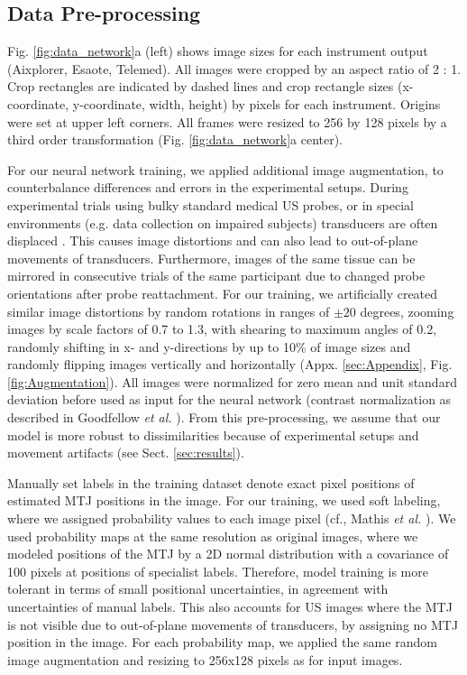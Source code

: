 \documentclass[journal,twoside,web]{ieeecolor}
\begin{document}
\subsection*{Data Pre-processing}
\label{sec:methods.model.datapre}
Fig. \ref{fig:data_network}a (left) shows image sizes for each instrument output (Aixplorer, Esaote, Telemed). All images were cropped by an aspect ratio of 2 : 1. Crop rectangles are indicated by dashed lines and crop rectangle sizes (x-coordinate, y-coordinate, width, height) by pixels for each instrument. Origins were set at upper left corners. All frames were resized to 256 by 128 pixels by a third order transformation (Fig. \ref{fig:data_network}a center). 

For our neural network training, we applied additional image augmentation, to counterbalance differences and errors in the experimental setups. During experimental trials using bulky standard medical US probes, or in special environments (e.g. data collection on impaired subjects) transducers are often displaced \cite{j:Leitner2019}. This causes image distortions and can also lead to out-of-plane movements of transducers. Furthermore, images of the same tissue can be mirrored in consecutive trials of the same participant due to changed probe orientations after probe reattachment. For our training, we artificially created similar image distortions by random rotations in ranges of $\pm 20$ degrees, zooming images by scale factors of 0.7 to 1.3, with shearing to maximum angles of 0.2, randomly shifting in x- and y-directions by up to 10\% of image sizes and randomly flipping images vertically and horizontally (Appx. \ref{sec:Appendix}, Fig.\ref{fig:Augmentation}). All images were normalized for zero mean and unit standard deviation before used as input for the neural network (contrast normalization as described in Goodfellow \textit{et al.} \cite{Goodfellow-et-al-2016}). From this pre-processing, we assume that our model is more robust to dissimilarities because of experimental setups and movement artifacts (see Sect. \ref{sec:results}).

Manually set labels in the training dataset denote exact pixel positions of estimated MTJ positions in the image. For our training, we used soft labeling, where we assigned probability values to each image pixel (cf., Mathis \textit{et al.} \cite{j:Mathis2018}). We used probability maps at the same resolution as original images, where we modeled positions of the MTJ by a 2D normal distribution with a covariance of 100 pixels at positions of specialist labels. Therefore, model training is more tolerant in terms of small positional uncertainties, in agreement with uncertainties of manual labels. This also accounts for US images where the MTJ is not visible due to out-of-plane movements of transducers, by assigning no MTJ position in the image. For each probability map, we applied the same random image augmentation and resizing to 256x128 pixels as for input images.
\end{document}
